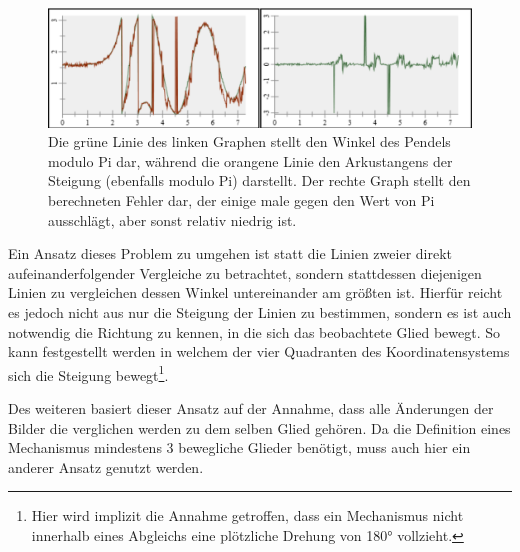 \begin{figure}[htb]
	\includegraphics[width=\textwidth]{gfx/max_abstand_steigung differenz.png}
	\caption{Die grüne Linie des linken Graphen stellt den Winkel des Pendels modulo Pi dar, während die orangene Linie  den Arkustangens der Steigung (ebenfalls modulo Pi) darstellt. Der rechte Graph stellt den berechneten Fehler dar, der einige male gegen den Wert von Pi ausschlägt, aber sonst relativ niedrig ist.}
	\label{fig:max_abstand_steigung differenz}
\end{figure}

Ein Ansatz dieses Problem zu umgehen ist statt die Linien zweier direkt aufeinanderfolgender Vergleiche zu betrachtet, sondern stattdessen diejenigen Linien zu vergleichen dessen Winkel untereinander am größten ist.
Hierfür reicht es jedoch nicht aus nur die Steigung der Linien zu bestimmen, sondern es ist auch notwendig die Richtung zu kennen, in die sich das beobachtete Glied bewegt.
So kann festgestellt werden in welchem der vier Quadranten des Koordinatensystems sich die Steigung bewegt\footnote{Hier wird implizit die Annahme getroffen, dass ein Mechanismus nicht innerhalb eines Abgleichs eine plötzliche Drehung von 180° vollzieht.}.


Des weiteren basiert dieser Ansatz auf der Annahme, dass alle Änderungen der Bilder die verglichen werden zu dem selben Glied gehören.
Da die Definition eines Mechanismus mindestens 3 bewegliche Glieder benötigt, muss auch hier ein anderer Ansatz genutzt werden. %



